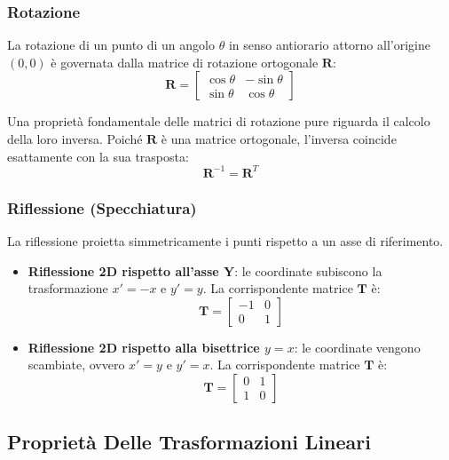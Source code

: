 ﻿\documentclass[11pt, a4paper]{article}
\begin{document}

\subsubsection{Rotazione}
La rotazione di un punto di un angolo $\theta$ in senso antiorario attorno all'origine $(0,0)$ è governata dalla matrice di rotazione ortogonale $\bm{R}$:
\[
\bm{R} = \begin{bmatrix} \cos\theta & -\sin\theta \\ \sin\theta & \cos\theta \end{bmatrix}
\]


Una proprietà fondamentale delle matrici di rotazione pure riguarda il calcolo della loro inversa. Poiché $\bm{R}$ è una matrice ortogonale, l'inversa coincide esattamente con la sua trasposta:
\[
\boxed{\bm{R}^{-1} = \bm{R}^T}
\]

\subsubsection{Riflessione (Specchiatura)}
La riflessione proietta simmetricamente i punti rispetto a un asse di riferimento.
\begin{itemize}
    \item \textbf{Riflessione 2D rispetto all'asse Y}: le coordinate subiscono la trasformazione $x' = -x$ e $y' = y$. La corrispondente matrice $\bm{T}$ è:
    \[
    \bm{T} = \begin{bmatrix} -1 & 0 \\ 0 & 1 \end{bmatrix}
    \]
    \item \textbf{Riflessione 2D rispetto alla bisettrice $y = x$}: le coordinate vengono scambiate, ovvero $x' = y$ e $y' = x$. La corrispondente matrice $\bm{T}$ è:
    \[
    \bm{T} = \begin{bmatrix} 0 & 1 \\ 1 & 0 \end{bmatrix}
    \]
\end{itemize}

\subsection{Proprietà Delle Trasformazioni Lineari}
\end{document}

